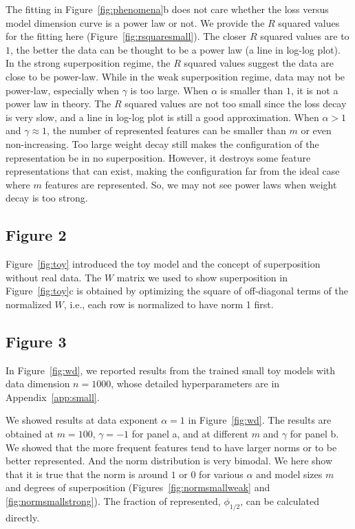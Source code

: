 \documentclass{article}
\begin{document}
The fitting in Figure~\ref{fig:phenomena}b does not care whether the loss versus model dimension curve is a power law or not. We provide the $R$ squared values for the fitting here (Figure~\ref{fig:rsquaresmall}). The closer $R$ squared values are to $1$, the better the data can be thought to be a power law (a line in log-log plot). In the strong superposition regime, the $R$ squared values suggest the data are close to be power-law. While in the weak superposition regime, data may not be power-law, especially when $\gamma$ is too large. When $\alpha$ is smaller than $1$, it is not a power law in theory. The $R$ squared values are not too small since the loss decay is very slow, and a line in log-log plot is still a good approximation. When $\alpha >1$ and $\gamma \approx 1$, the number of represented features can be smaller than $m$ or even non-increasing. Too large weight decay still makes the configuration of the representation be in no superposition. However, it destroys some feature representations that can exist, making the configuration far from the ideal case where $m$ features are represented. So, we may not see power laws when weight decay is too strong.

\subsection{Figure 2}

Figure~\ref{fig:toy} introduced the toy model and the concept of superposition without real data. The $W$ matrix we used to show superposition in Figure~\ref{fig:toy}c is obtained by optimizing the square of off-diagonal terms of the normalized $W$, i.e., each row is normalized to have norm 1 first.

\subsection{Figure 3}\label{app:fig3}

In Figure~\ref{fig:wd}, we reported results from the trained small toy models with data dimension $n = 1000$, whose detailed hyperparameters are in Appendix~\ref{app:small}.

We showed results at data exponent $\alpha = 1$ in Figure~\ref{fig:wd}. The results are obtained at $m =100$, $\gamma = -1$ for panel a, and at different $m$ and $\gamma$ for panel b. We showed that the more frequent features tend to have larger norms or to be better represented. And the norm distribution is very bimodal. We here show that it is true that the norm is around $1$ or $0$ for various $\alpha$ and model sizes $m$ and degrees of superposition (Figures~\ref{fig:normsmallweak} and \ref{fig:normsmallstrong}). The fraction of represented, $\phi_{1/2}$, can be calculated directly.
\end{document}
